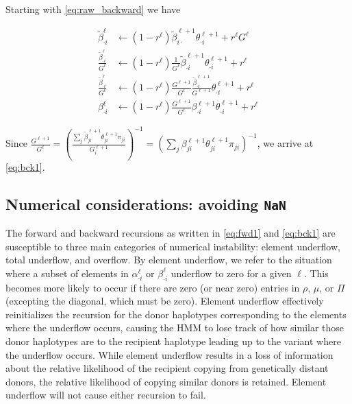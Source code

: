 \documentclass[a4paper]{article}
\begin{document}
Starting with \eqref{eq:raw_backward} we have

\begin{align}
	\tilde{\beta}_{\cdot i}^{\ell} &\gets \left( 1- r^{\ell}\right) \tilde{\beta}_{i\cdot}^{\ell+1} \theta^{\ell+1}_{\cdot i} + r^{\ell} G^\ell \nonumber \\
	\frac{\tilde{\beta}_{\cdot i}^{\ell}}{G^{\ell}} &\gets \left( 1- r^{\ell}\right) \frac{1}{G^{\ell}} \tilde{\beta}_{\cdot i}^{\ell+1} \theta^{\ell+1}_{\cdot i} + r^\ell \nonumber \\
	\frac{\tilde{\beta}_{\cdot i}^{\ell}}{ G^{\ell}} &\gets \left( 1- r^{\ell}\right) \frac{G^{\ell+1}}{G^{\ell}} \frac{\tilde{\beta}_{\cdot i}^{\ell+1}}{G^{\ell+1}} \theta^{\ell+1}_{\cdot i} + r^\ell \nonumber \\
	\beta_{\cdot i}^{\ell} &\gets \left( 1- r^{\ell}\right) \frac{G^{\ell+1}}{ G^{\ell}} \beta_{\cdot i}^{\ell+1} \theta^{\ell+1}_{\cdot i} + r^\ell \nonumber
\end{align}

Since
\(\frac{G^{\ell+1}}{ G^{\ell}} = \left( \frac{\underset{j}{\sum} \tilde{\beta}_{ji}^{\ell+1}\theta_{ji}^{\ell+1} \pi_{ji} }{G_i^{\ell+1}}\right)^{-1} = \left(\underset{j}{\sum} \beta_{ji}^{\ell+1}\theta_{ji}^{\ell+1} \pi_{ji}\right)^{-1}\),
we arrive at \eqref{eq:bck1}.

\subsection[Numerical considerations: avoiding NaN]{Numerical considerations: avoiding \texttt{NaN}}
\label{apx:nan}

The forward and backward recursions as written in \eqref{eq:fwd1} and \eqref{eq:bck1} are susceptible to three main categories of numerical instability: element underflow, total underflow, and overflow.
By element underflow, we refer to the situation where a subset of elements in \(\alpha_{\cdot i}^\ell\) or \(\beta_{\cdot i}^\ell\) underflow to zero for a given \(\ell\).
This becomes more likely to occur if there are zero (or near zero) entries in \(\rho\), \(\mu\), or \(\Pi\) (excepting the diagonal, which must be zero).
Element underflow effectively reinitializes the recursion for the donor haplotypes corresponding to the elements where the underflow occurs, causing the HMM to lose track of how similar those donor haplotypes are
to the recipient haplotype leading up to the variant where the underflow occurs.
While element underflow results in a loss of information about the relative likelihood of the recipient copying from genetically distant donors, the relative likelihood of copying similar donors is retained.
Element underflow will not cause either recursion to fail.
\end{document}
